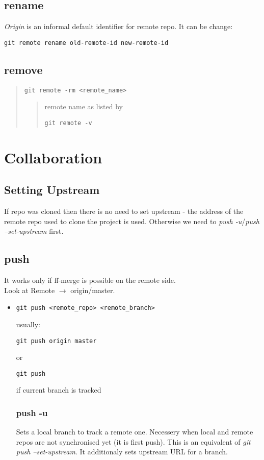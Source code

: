 \documentclass{report}
\begin{document}
\subsection{rename}
\textit{Origin} is an informal default identifier for remote repo. It can be change:
\begin{verbatim}
git remote rename old-remote-id new-remote-id
\end{verbatim}

\subsection{remove}
\begin{quote}
\begin{verbatim}
git remote -rm <remote_name>
\end{verbatim}
\begin{quote}
remote name as listed by
\begin{verbatim}
git remote -v
\end{verbatim}
\end{quote}
\end{quote}


\section{Collaboration}

\subsection{Setting Upstream}
If repo was cloned then there is no need to set upstream - the address of the remote repo used to clone the project is used.
Otherwise we need to \textit{push -u}/\textit{push --set-upstream} first.

\subsection{push}
It works only if ff-merge is possible on the remote side. \\
Look at Remote $\rightarrow$ origin/master.
\begin{itemize}
\item \begin{verbatim}
git push <remote_repo> <remote_branch>
\end{verbatim}
usually:
\begin{verbatim}
git push origin master
\end{verbatim}
or
\begin{verbatim}
git push
\end{verbatim}
if current branch is tracked

\subsubsection{push -u}
Sets a local branch to track a remote one. Necessery when local and remote repos are not synchronised yet (it is first push). 
This is an equivalent of \textit{git push --set-upstream}. It additionaly sets upstream URL for a branch.

\end{itemize}
\end{document}
